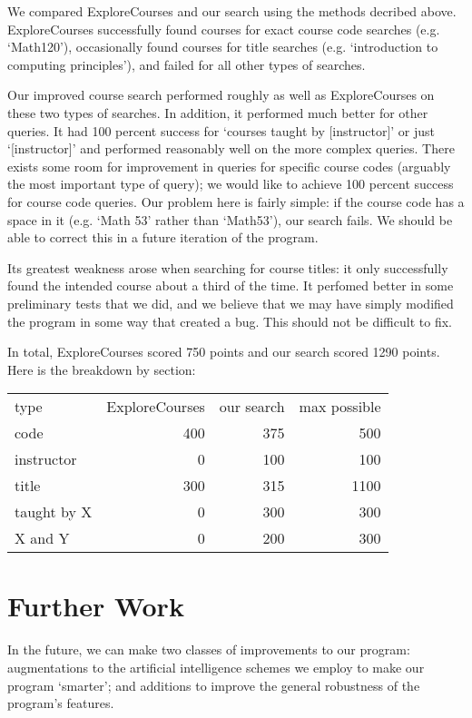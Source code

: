 \documentclass[12pt]{article}
\begin{document}
We compared ExploreCourses and our search using the methods decribed
above. ExploreCourses successfully found courses for exact course code
searches (e.g. `Math120'), occasionally found courses for title
searches (e.g. `introduction to computing principles'), and failed for
all other types of searches.

Our improved course search performed roughly as well as ExploreCourses
on these two types of searches. In addition, it performed much better
for other queries. It had 100 percent success for `courses taught by
[instructor]' or just `[instructor]' and performed reasonably well on
the more complex queries. There exists some room for improvement in
queries for specific course codes (arguably the most important type of
query); we would like to achieve 100 percent success for course code
queries. Our problem here is fairly simple: if the course code has a
space in it (e.g. `Math 53' rather than `Math53'), our search
fails. We should be able to correct this in a future iteration of the
program.

Its greatest weakness arose when searching for course titles: it only
successfully found the intended course about a third of the time. It
perfomed better in some preliminary tests that we did, and we believe
that we may have simply modified the program in some way that created
a bug. This should not be difficult to fix.

In total, ExploreCourses scored 750 points and our search scored 1290
points. Here is the breakdown by section: 

\begin{tabular}{l r r r}
type & ExploreCourses & our search & max possible \\
code & 400 & 375 & 500\\
instructor & 0 & 100 & 100 \\
title & 300 & 315 & 1100 \\
taught by X & 0 & 300 & 300 \\
X and Y & 0 & 200 & 300 \\
\end{tabular}
	
\section*{Further Work}

In the future, we can make two classes of improvements to our program:
augmentations to the artificial intelligence schemes we employ to make
our program `smarter'; and additions to improve the general robustness
of the program's features.
\end{document}
